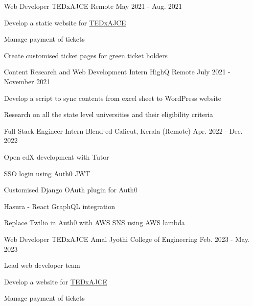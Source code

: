 
\begin{cventries}
  \cventry
    {Web Developer} %
    {TEDxAJCE} %
    {Remote}
    {May 2021 - Aug. 2021} %
    {
      \begin{cvitems} %
        \item Develop a static website for \hyperlink{https://www.tedxajce.in/tedx2021}{TEDxAJCE}
        \item Manage payment of tickets
        \item Create customised ticket pages for green ticket holders
      \end{cvitems}
    }

  \cventry
    {Content Research and Web Development Intern} %
    {HighQ} %
    {Remote} %
    {July 2021 - November 2021} %
    {
      \begin{cvitems} %
        \item Develop a script to sync contents from excel sheet to WordPress website
        \item Research on all the state level universities and their eligibility criteria
      \end{cvitems}
    }

  \cventry
    {Full Stack Engineer Intern} %
    {Blend-ed} %
    {Calicut, Kerala (Remote)   } %
    {Apr. 2022 - Dec. 2022} %
    {
      \begin{cvitems} %
        \item Open edX development with Tutor
        \item SSO login using Auth0 JWT
        \item Customised Django OAuth plugin for Auth0
        \item Hasura - React GraphQL integration
        \item Replace Twilio in Auth0 with AWS SNS using AWS lambda
      \end{cvitems}
    }

  \cventry
    {Web Developer} %
    {TEDxAJCE} %
    {Amal Jyothi College of Engineering}
    {Feb. 2023 - May. 2023} %
    {
      \begin{cvitems} %
        \item Lead web developer team
        \item Develop a website for \hyperlink{https://www.tedxajce.in/tedx2023}{TEDxAJCE}
        \item Manage payment of tickets
      \end{cvitems}
    }


\end{cventries}
